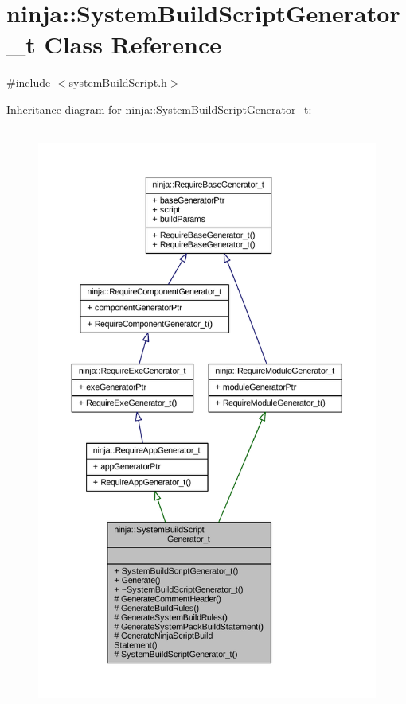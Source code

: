 \hypertarget{classninja_1_1_system_build_script_generator__t}{}\section{ninja\+:\+:System\+Build\+Script\+Generator\+\_\+t Class Reference}
\label{classninja_1_1_system_build_script_generator__t}


{\ttfamily \#include $<$system\+Build\+Script.\+h$>$}



Inheritance diagram for ninja\+:\+:System\+Build\+Script\+Generator\+\_\+t\+:
\nopagebreak
\begin{figure}[H]
\begin{center}
\leavevmode
\includegraphics[height=550pt]{classninja_1_1_system_build_script_generator__t__inherit__graph}
\end{center}
\end{figure}



